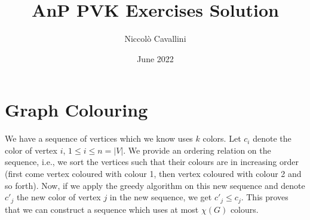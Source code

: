 \documentclass{article}
\title{AnP PVK Exercises Solution}
\author{Niccolò Cavallini}
\date{June 2022}
\begin{document}
\maketitle

\section{Graph Colouring}

We have a sequence of vertices which we know uses $k$ colors. Let $c_i$ denote the color of vertex $i$, $1 \leq i \leq n = |V|$. We provide an ordering relation on the sequence, i.e., we sort the vertices such that their colours are in increasing order (first come vertex coloured with colour 1, then vertex coloured with colour 2 and so forth). Now, if we apply the greedy algorithm on this new sequence and denote $c'_j$ the new color of vertex $j$ in the new sequence, we get $c'_j \leq c_j$. This proves that we can construct a sequence which uses at most $\chi(G)$ colours. 

\section{}
\section{}
\section{}
\end{document}
